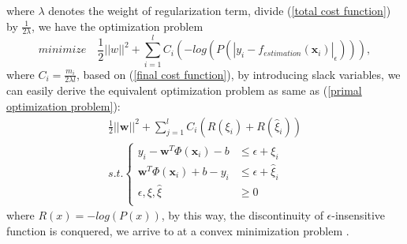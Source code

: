 \documentclass[12pt, draftclsnofoot, onecolumn]{IEEEtran}
\begin{document}
where $\lambda$ denotes the weight of regularization term, divide (\ref{total cost function}) by $\frac{1}{2\lambda}$, we have the optimization problem  
\begin{equation}
minimize \quad \frac{1}{2}||w||^{2}+\sum_{i=1}^{l}C_{i}(-log(P(|y_{i}-f_{estimation}(\mathbf{x}_{i})|_{\epsilon}))),
\label{final cost function}
\end{equation}
where $C_{i}=\frac{m_{i}}{2\lambda l}$, based on (\ref{final cost function}), by introducing slack variables, we can easily derive the equivalent optimization problem as same as (\ref{primal optimization problem}):
\begin{eqnarray}
\nonumber
\frac{1}{2}||\mathbf{w}||^{2}+\sum_{j=1}^{l}C_{i}(R(\xi_{i})+R(\hat{\xi}_{i}))\\
s.t. \left\{\begin{array}{ll}
y_{i}-\mathbf{w}^{T}\Phi(\mathbf{x}_{i})-b &\leq \epsilon+\xi_{i}\\
\mathbf{w}^{T}\Phi(\mathbf{x}_{i})+b-y_{i} &\leq \epsilon+\hat{\xi}_{i}\\
\epsilon, \xi,\hat{\xi} &\geq 0\\
\end{array}\right.
\end{eqnarray}
where $R(x)=-log(P(x))$, by this way, the discontinuity of $\epsilon$-insensitive function is conquered, we arrive to at a convex minimization problem \cite{smola and skpkof 1998a tutorial of SVR}. 
\end{document}

